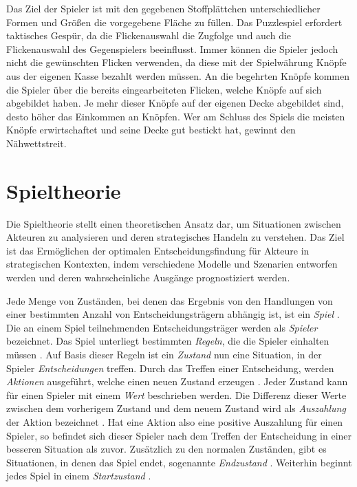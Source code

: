 Das Ziel der Spieler ist mit den gegebenen Stoffplättchen unterschiedlicher Formen und Größen die vorgegebene Fläche zu füllen. Das Puzzlespiel erfordert taktisches Gespür, da die Flickenauswahl die Zugfolge und auch die Flickenauswahl des Gegenspielers beeinflusst. Immer können die Spieler jedoch nicht die gewünschten Flicken verwenden, da diese mit der Spielwährung Knöpfe aus der eigenen Kasse bezahlt werden müssen. An die begehrten Knöpfe kommen die Spieler über die bereits eingearbeiteten Flicken, welche Knöpfe auf sich abgebildet haben. Je mehr dieser Knöpfe auf der eigenen Decke abgebildet sind, desto höher das Einkommen an Knöpfen. Wer am Schluss des Spiels die meisten Knöpfe erwirtschaftet und seine Decke gut bestickt hat, gewinnt den Nähwettstreit. \cite{SpielDesJahresPatchwork}

\vspace*{-10cm}
\pagebreak

\section{Spieltheorie}
\label{chapter:spieltheorie}

Die Spieltheorie stellt einen theoretischen Ansatz dar, um Situationen zwischen Akteuren zu analysieren und deren strategisches Handeln zu verstehen. Das Ziel ist das Ermöglichen der optimalen Entscheidungsfindung für Akteure in strategischen Kontexten, indem verschiedene Modelle und Szenarien entworfen werden und deren wahrscheinliche Ausgänge prognostiziert werden. \cite{2024.GameTheory}

Jede Menge von Zuständen, bei denen das Ergebnis von den Handlungen von einer bestimmten Anzahl von Entscheidungsträgern abhängig ist, ist ein \emph{Spiel} \cite{2024.GameTheory}. Die an einem Spiel teilnehmenden Entscheidungsträger werden als \emph{Spieler} bezeichnet. Das Spiel unterliegt bestimmten \emph{Regeln}, die die Spieler einhalten müssen \cite[S. 1]{2014.GameTheoryThroughExamples}. Auf Basis dieser Regeln ist ein \emph{Zustand} nun eine Situation, in der Spieler \emph{Entscheidungen} treffen. Durch das Treffen einer Entscheidung, werden \emph{Aktionen} ausgeführt, welche einen neuen Zustand erzeugen \cite[S. 1]{2014.GameTheoryThroughExamples}. Jeder Zustand kann für einen Spieler mit einem \emph{Wert} beschrieben werden. Die Differenz dieser Werte zwischen dem vorherigem Zustand und dem neuem Zustand wird als \emph{Auszahlung} der Aktion bezeichnet \cite{2024.GameTheory}. Hat eine Aktion also eine positive Auszahlung für einen Spieler, so befindet sich dieser Spieler nach dem Treffen der Entscheidung in einer besseren Situation als zuvor. Zusätzlich zu den normalen Zuständen, gibt es Situationen, in denen das Spiel endet, sogenannte \emph{Endzustand} \cite[S. 53]{2014.GameTheoryThroughExamples}. Weiterhin beginnt jedes Spiel in einem \emph{Startzustand} \cite[S. 53]{2014.GameTheoryThroughExamples}.

